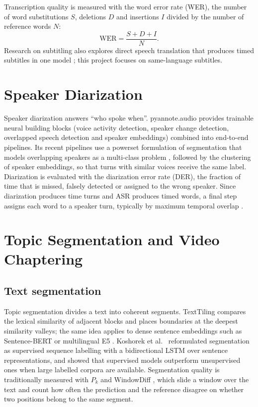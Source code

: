 Transcription quality is measured with the word error rate (WER), the number of word substitutions $S$, deletions $D$ and insertions $I$ divided by the number of reference words $N$:
\begin{equation}
\mathrm{WER} = \frac{S + D + I}{N}.
\label{eq:wer}
\end{equation}
Research on subtitling also explores direct speech translation that produces timed subtitles in one model \cite{papi2023subtitling}; this project focuses on same-language subtitles.

\section{Speaker Diarization}

Speaker diarization answers ``who spoke when''. pyannote.audio \cite{bredin2020pyannote} provides trainable neural building blocks (voice activity detection, speaker change detection, overlapped speech detection and speaker embeddings) combined into end-to-end pipelines. Its recent pipelines use a powerset formulation of segmentation that models overlapping speakers as a multi-class problem \cite{plaquet2023powerset}, followed by the clustering of speaker embeddings, so that turns with similar voices receive the same label. Diarization is evaluated with the diarization error rate (DER), the fraction of time that is missed, falsely detected or assigned to the wrong speaker. Since diarization produces time turns and ASR produces timed words, a final step assigns each word to a speaker turn, typically by maximum temporal overlap \cite{bain2023whisperx}.

\section{Topic Segmentation and Video Chaptering}

\subsection*{Text segmentation}

Topic segmentation divides a text into coherent segments. TextTiling \cite{hearst1997texttiling} compares the lexical similarity of adjacent blocks and places boundaries at the deepest similarity valleys; the same idea applies to dense sentence embeddings such as Sentence-BERT \cite{reimers2019sbert} or multilingual E5 \cite{wang2024me5}. Koshorek et al.\ \cite{koshorek2018textseg} reformulated segmentation as supervised sequence labelling with a bidirectional LSTM \cite{hochreiter1997lstm} over sentence representations, and showed that supervised models outperform unsupervised ones when large labelled corpora are available. Segmentation quality is traditionally measured with $P_k$ \cite{beeferman1999pk} and WindowDiff \cite{pevzner2002windowdiff}, which slide a window over the text and count how often the prediction and the reference disagree on whether two positions belong to the same segment.

